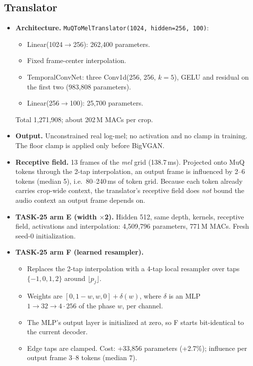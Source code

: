 \documentclass[10pt,letterpaper]{article}
\begin{document}
\subsection{Translator}
\begin{itemize}
\item \textbf{Architecture.} \texttt{MuQToMelTranslator(1024, hidden=256, 100)}:
  \begin{itemize}
  \item Linear(1024$\to$256): 262{,}400 parameters.
  \item Fixed frame-center interpolation.
  \item TemporalConvNet: three Conv1d(256, 256, $k{=}5$), GELU and residual on the first two (983{,}808 parameters).
  \item Linear(256$\to$100): 25{,}700 parameters.
  \end{itemize}
  Total 1{,}271{,}908; about 202\,M MACs per crop.
\item \textbf{Output.} Unconstrained real log-mel; no activation and no clamp in training. The floor clamp is applied only before BigVGAN.
\item \textbf{Receptive field.} 13 frames of the \emph{mel} grid (138.7\,ms). Projected onto MuQ tokens through the 2-tap interpolation, an output frame is influenced by 2--6 tokens (median 5), i.e.\ 80--240\,ms of token grid. Because each token already carries crop-wide context, the translator's receptive field does \emph{not} bound the audio context an output frame depends on.
\item \textbf{TASK-25 arm E (width $\times$2).} Hidden 512, same depth, kernels, receptive field, activations and interpolation: 4{,}509{,}796 parameters, 771\,M MACs. Fresh seed-0 initialization.
\item \textbf{TASK-25 arm F (learned resampler).}
  \begin{itemize}
  \item Replaces the 2-tap interpolation with a 4-tap local resampler over taps $\{-1,0,1,2\}$ around $\lfloor p_j\rfloor$.
  \item Weights are $[0,1{-}w,w,0]+\delta(w)$, where $\delta$ is an MLP $1\to32\to4\cdot256$ of the phase $w$, per channel.
  \item The MLP's output layer is initialized at zero, so F starts bit-identical to the current decoder.
  \item Edge taps are clamped. Cost: +33{,}856 parameters (+2.7\%); influence per output frame 3--8 tokens (median 7).
  \end{itemize}
\end{itemize}
\end{document}
